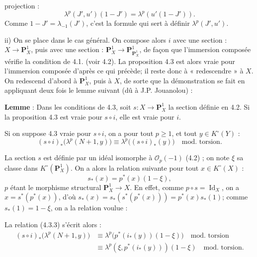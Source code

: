 \documentclass{article}
\providecommand{\Id}{\operatorname{Id}}
\begin{document}
projection :
\[
  \lambda^p(J',u')(1-J')=\lambda^p(u'(1-J')).
\]
Comme \(1-J'=\lambda_{-1}(J')\), c'est la formule qui sert à définir \(\lambda^p(J',u')\).

ii) On se place dans le cas général. On compose alors \(i\) avec une section : \(X\to\mathbf P_X^1\), puis avec une section : \(\mathbf P_X^1\to\mathbf P_{\mathbf P_X^1}^1\), de façon que l'immersion composée vérifie la condition de 4.1. (voir 4.2). La proposition 4.3 est alors vraie pour l'immersion composée d'après ce qui précède; il reste donc à « redescendre » à \(X\). On redescend d'abord à \(\mathbf P_X^1\), puis à \(X\), de sorte que la démonstration se fait en appliquant deux fois le lemme suivant (dû à J.P. Jouanolou) :

\textbf{Lemme} : Dans les conditions de 4.3, soit \(s:X\to\mathbf P_X^1\) la section définie en 4.2. Si la proposition 4.3 est vraie pour \(s\circ i\), elle est vraie pour \(i\).

Si on suppose 4.3 vraie pour \(s\circ i\), on a pour tout \(p\ge1\), et tout \(y\in K^\circ(Y)\) :
\begin{equation}\tag{4.3.3}
 (s\circ i)_*\bigl(\lambda^p(N+1,y)\bigr)
 \equiv
 \lambda^p\bigl((s\circ i)_*(y)\bigr)
 \quad\text{mod.\ torsion}.
\end{equation}

La section \(s\) est définie par un idéal isomorphe à \(\mathcal O_p(-1)\) (4.2) ; on note \(\xi\) sa classe dans \(K^\circ(\mathbf P_X^1)\). On a alors la relation suivante pour tout \(x\in K^\circ(X)\) :
\[
  s_*(x)=p^*(x)(1-\xi),
\]
\(p\) étant le morphisme structural \(\mathbf P_X^1\to X\). En effet, comme \(p\circ s=\Id_X\), on a \(x=s^*(p^*(x))\), d'où \(s_*(x)=s_*(s^*(p^*(x)))=p^*(x)s_*(1)\); comme \(s_*(1)=1-\xi\), on a la relation voulue :

La relation (4.3.3) s'écrit alors :
\[
\begin{aligned}
(s\circ i)_*\bigl(\lambda^p(N+1,y)\bigr)
&\equiv \lambda^p\bigl(p^*(i_*(y))(1-\xi)\bigr)\quad\text{mod.\ torsion}\\
&\equiv \lambda^p(\xi,p^*(i_*(y)))(1-\xi)\quad\text{mod.\ torsion}.
\end{aligned}
\]
\end{document}
